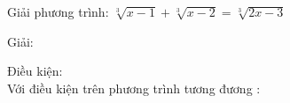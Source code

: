 \begin{vd}
    Giải phương trình: $ \sqrt[3]{x-1}+\sqrt[3]{x-2} = \sqrt[3]{2x-3}$
\end{vd}
\begin{center}
    Giải:
\end{center}

Điều kiện: $  $ \\
Với điều kiện trên phương trình tương đương : \\


